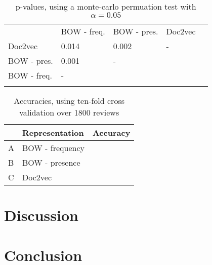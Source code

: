 \documentclass[a4paper]{article}
\begin{document}
\begin{multicols}{2}
\begin{table*}
    \centering
    \begin{tabular}{lllll}
    \cline{1-4}
    \multicolumn{1}{|l|}{}            & \multicolumn{1}{l|}{BOW - freq.} & \multicolumn{1}{l|}{BOW - pres.} & \multicolumn{1}{l|}{Doc2vec} &  \\ \cline{1-4}
    \multicolumn{1}{|l|}{Doc2vec}     & \multicolumn{1}{l|}{0.014}       & \multicolumn{1}{l|}{0.002}       & \multicolumn{1}{l|}{-}       &  \\ \cline{1-4}
    \multicolumn{1}{|l|}{BOW - pres.} & \multicolumn{1}{l|}{0.001}       & \multicolumn{1}{l|}{-}           &                              &  \\ \cline{1-3}
    \multicolumn{1}{|l|}{BOW - freq.} & \multicolumn{1}{l|}{-}           &                                  &                              &  \\ \cline{1-2}
                                      &                                  &                                  &                              & 
    \end{tabular}
    \caption{p-values, using a monte-carlo permuation test with $\alpha=0.05$}
    \label{tab:pval-table}

\end{table*}

\begin{table*}
    \centering
    \begin{tabular}{|l|l|l|}
    \hline
      & Representation  & Accuracy \\ \hline
    A & BOW - frequency &          \\ \hline
    B & BOW - presence  &          \\ \hline
    C & Doc2vec         &          \\ \hline
    \end{tabular}
    \caption{Accuracies, using ten-fold cross validation over 1800 reviews}
    \label{tab:acc-table}
\end{table*}

\section{Discussion}
\blindtext
\section{Conclusion}
\blindtext

\end{multicols}

\clearpage


\end{document}
